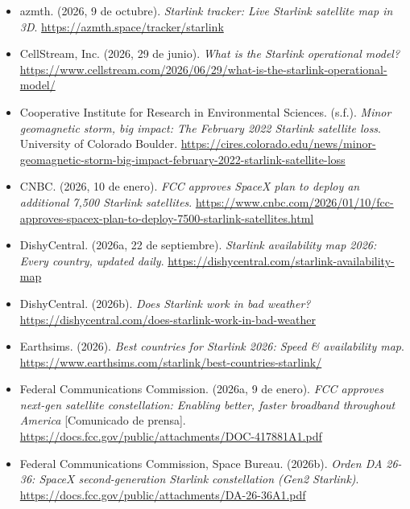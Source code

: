 \documentclass[12pt,letterpaper]{article}
\begin{document}
\begin{itemize}[leftmargin=1.5em,itemsep=7pt]

\item[] azmth. (2026, 9 de octubre). \textit{Starlink tracker: Live Starlink satellite map in 3D}. \url{https://azmth.space/tracker/starlink}

\item[] CellStream, Inc. (2026, 29 de junio). \textit{What is the Starlink operational model?} \url{https://www.cellstream.com/2026/06/29/what-is-the-starlink-operational-model/}

\item[] Cooperative Institute for Research in Environmental Sciences. (s.f.). \textit{Minor geomagnetic storm, big impact: The February 2022 Starlink satellite loss}. University of Colorado Boulder. \url{https://cires.colorado.edu/news/minor-geomagnetic-storm-big-impact-february-2022-starlink-satellite-loss}

\item[] CNBC. (2026, 10 de enero). \textit{FCC approves SpaceX plan to deploy an additional 7,500 Starlink satellites}. \url{https://www.cnbc.com/2026/01/10/fcc-approves-spacex-plan-to-deploy-7500-starlink-satellites.html}

\item[] DishyCentral. (2026a, 22 de septiembre). \textit{Starlink availability map 2026: Every country, updated daily}. \url{https://dishycentral.com/starlink-availability-map}

\item[] DishyCentral. (2026b). \textit{Does Starlink work in bad weather?} \url{https://dishycentral.com/does-starlink-work-in-bad-weather}

\item[] Earthsims. (2026). \textit{Best countries for Starlink 2026: Speed \& availability map}. \url{https://www.earthsims.com/starlink/best-countries-starlink/}

\item[] Federal Communications Commission. (2026a, 9 de enero). \textit{FCC approves next-gen satellite constellation: Enabling better, faster broadband throughout America} [Comunicado de prensa]. \url{https://docs.fcc.gov/public/attachments/DOC-417881A1.pdf}

\item[] Federal Communications Commission, Space Bureau. (2026b). \textit{Orden DA 26-36: SpaceX second-generation Starlink constellation (Gen2 Starlink)}. \url{https://docs.fcc.gov/public/attachments/DA-26-36A1.pdf}


\end{itemize}
\end{document}
